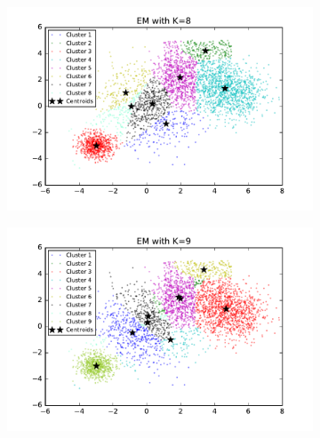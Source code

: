 \begin{description}
\begin{description}
\begin{figure}[!h]
\begin{subfigure}[b]{0.475\textwidth}
        \end{subfigure}
        \hfill
        \begin{subfigure}[b]{0.475\textwidth}  
            \centering 
            \includegraphics[width=\textwidth]{./figures/bigClustering_EM_8.pdf}
        \end{subfigure}
        \begin{subfigure}[b]{0.475\textwidth}   
            \centering 
            \includegraphics[width=\textwidth]{./figures/bigClustering_EM_9.pdf}
        \end{subfigure}
        \hfill
        \begin{subfigure}[b]{0.475\textwidth}   
            \centering 

\end{subfigure}
\end{figure}
\end{description}
\end{description}
